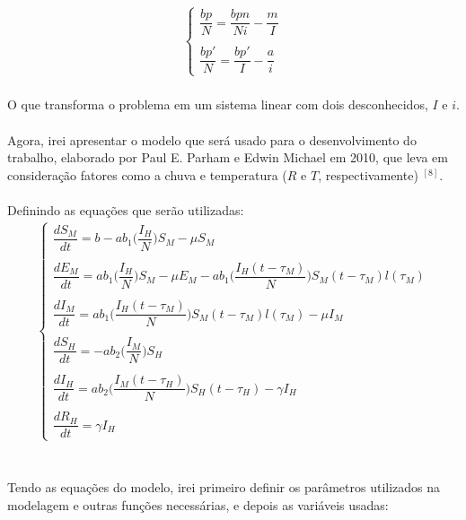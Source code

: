 \documentclass[12pt]{article}
\begin{document}
\begin{gather*}
\begin{cases}
\dfrac{bp}{N} = \dfrac{bpn}{Ni} -\dfrac{m}{I} \\
\\
\dfrac{bp'}{N} = \dfrac{bp'}{I} -\dfrac{a}{i} 
\end{cases}
\end{gather*}
\\
O que transforma o problema em um sistema linear com dois desconhecidos, $I$ e $i$.
\\\\
Agora, irei apresentar o modelo que será usado para o desenvolvimento do trabalho, elaborado por Paul E. Parham e Edwin Michael em 2010, que leva em consideração fatores como a chuva e temperatura ($R$ e $T$, respectivamente) $^{[8]}$. 
\\\\
Definindo as equações que serão utilizadas:
\begin{gather*}
\begin{cases}
\dfrac{dS_M}{dt} = b - ab_1\bigg(\dfrac{I_H}{N}\bigg)S_M - \mu S_M\\
\\
\dfrac{dE_M}{dt} = ab_1\bigg(\dfrac{I_H}{N}\bigg)S_M - \mu E_M - ab_1\bigg(\dfrac{I_H(t-\tau_M)}{N}\bigg)S_M(t-\tau_M)l(\tau_M)\\
\\
\dfrac{dI_M}{dt} = ab_1\bigg(\dfrac{I_H(t-\tau_M)}{N}\bigg)S_M(t-\tau_M)l(\tau_M) -\mu I_M\\
\\
\dfrac{dS_H}{dt} = -ab_2\bigg(\dfrac{I_M}{N}\bigg)S_H\\
\\
\dfrac{dI_H}{dt} = ab_2\bigg(\dfrac{I_M(t-\tau_H)}{N}\bigg)S_H(t-\tau_H)-\gamma I_H\\
\\
\dfrac{dR_H}{dt} = \gamma I_H
\end{cases}
\end{gather*}
\\\\
Tendo as equações do modelo, irei primeiro definir os parâmetros utilizados na modelagem e outras funções necessárias, e depois as variáveis usadas:
\end{document}
